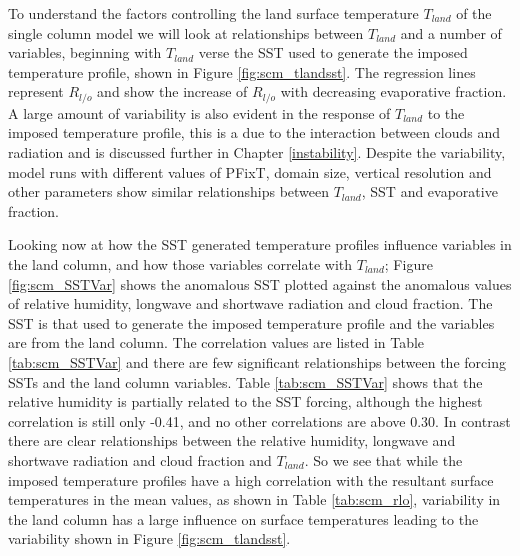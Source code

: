 To understand the factors controlling the land surface temperature $T_{land}$ of 
the single column model we will look at relationships between $T_{land}$ and a 
number of variables, beginning with $T_{land}$ verse the SST used to generate 
the imposed temperature profile, shown in Figure \ref{fig:scm_tlandsst}. The 
regression lines represent $R_{l/o}$ and show the increase of $R_{l/o}$ with 
decreasing evaporative fraction.  A large amount of variability is also evident 
in the response of $T_{land}$ to the imposed temperature profile, this is a due 
to the interaction between clouds and radiation and is discussed further in 
Chapter \ref{instability}.  Despite the variability, model runs with different 
values of PFixT, domain size, vertical resolution and other parameters show 
similar relationships between $T_{land}$, SST and evaporative fraction.

Looking now at how the SST generated temperature profiles influence variables in 
the land column, and how those variables correlate with $T_{land}$; Figure 
\ref{fig:scm_SSTVar} shows the anomalous SST plotted against the anomalous 
values of relative humidity, longwave and shortwave radiation and cloud 
fraction.  The SST is that used to generate the imposed temperature profile and 
the variables are from the land column. The correlation values are listed in 
Table \ref{tab:scm_SSTVar} and there are few significant relationships between 
the forcing SSTs and the land column variables. Table \ref{tab:scm_SSTVar} shows 
that the relative humidity is partially related to the SST forcing, although the 
highest correlation is still only -0.41, and no other correlations are above 
0.30. In contrast there are clear relationships between the relative humidity, 
longwave and shortwave radiation and cloud fraction and $T_{land}$. So we see 
that while the imposed temperature profiles have a high correlation with the 
resultant surface temperatures in the mean values, as shown in Table 
\ref{tab:scm_rlo}, variability in the land column has a large influence on 
surface temperatures leading to the variability shown in Figure 
\ref{fig:scm_tlandsst}.

